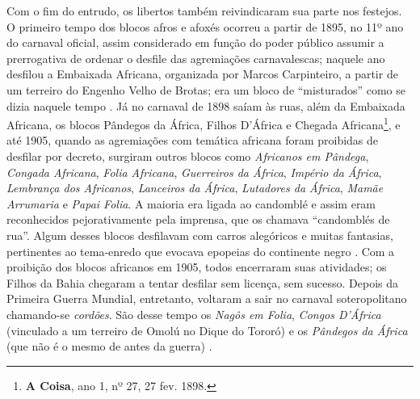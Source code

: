 Com o fim do entrudo, os libertos também reivindicaram sua parte nos festejos. O primeiro tempo dos blocos afros e afoxés ocorreu a partir de 1895, no 11º ano do carnaval oficial, assim considerado em função do poder público assumir a prerrogativa de ordenar o desfile das agremiações carnavalescas; naquele ano desfilou a Embaixada Africana, organizada por Marcos Carpinteiro, a partir de um terreiro do Engenho Velho de Brotas; era um bloco de ``misturados'' como se dizia naquele tempo \cite{cadena_doistemposafro_2017}. Já no carnaval de 1898 saíam às ruas, além da Embaixada Africana, os blocos Pândegos da África, Filhos D'África e Chegada Africana\footnote{\textbf{A Coisa}, ano 1, nº 27, 27 fev. 1898.}, e até 1905, quando as agremiações com temática africana foram proibidas de desfilar por decreto, surgiram outros blocos como \textit{Africanos em Pândega}, \textit{Congada Africana}, \textit{Folia Africana}, \textit{Guerreiros da África}, \textit{Império da África}, \textit{Lembrança dos Africanos}, \textit{Lanceiros da África}, \textit{Lutadores da África}, \textit{Mamãe Arrumaria} e \textit{Papai Folia}.  A maioria era ligada ao candomblé e assim eram reconhecidos pejorativamente pela imprensa, que os chamava ``candomblés de rua''. Algum desses blocos desfilavam com carros alegóricos e muitas fantasias, pertinentes ao tema-enredo que evocava epopeias do continente negro \cite{cadena_doistemposafro_2017}. Com a proibição dos blocos africanos em 1905, todos encerraram suas atividades; os Filhos da Bahia chegaram a tentar desfilar sem licença, sem sucesso. Depois da Primeira Guerra Mundial, entretanto, voltaram a sair no carnaval soteropolitano chamando-se \textit{cordões}. São desse tempo os \textit{Nagôs em Folia}, \textit{Congos D’África} (vinculado a um terreiro de Omolú no Dique do Tororó) e os \textit{Pândegos da África} (que não é o mesmo de antes da guerra) \cite{cadena_doistemposafro_2017}.